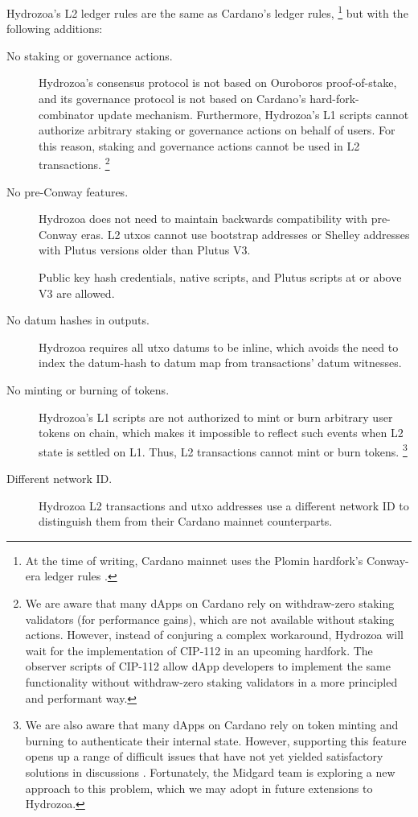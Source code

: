 \documentclass[../hydrozoa.tex]{subfiles}
\begin{document}
Hydrozoa's L2 ledger rules are the same as Cardano's ledger rules,%
\footnote{At the time of writing, Cardano mainnet uses the Plomin hardfork's Conway-era ledger rules \citep{IntersectMBOCardanoLedgerV117402025}.}
but with the following additions:
\begin{description}
    \item[No staking or governance actions.]
      Hydrozoa's consensus protocol is not based on Ouroboros proof-of-stake, and its governance protocol is not based on Cardano's hard-fork-combinator update mechanism.
      Furthermore, Hydrozoa's L1 scripts cannot authorize arbitrary staking or governance actions on behalf of users.
      For this reason, staking and governance actions cannot be used in L2 transactions.%
      \footnote{We are aware that many dApps on Cardano rely on withdraw-zero staking validators (for performance gains), which are not available without staking actions.
        However, instead of conjuring a complex workaround, Hydrozoa will wait for the implementation of CIP-112 \citep{DiSarroCIP112ObserveScript2024} in an upcoming hardfork.
        The observer scripts of CIP-112 allow dApp developers to implement the same functionality without withdraw-zero staking validators in a more principled and performant way.}
    \item[No pre-Conway features.] Hydrozoa does not need to maintain backwards compatibility with pre-Conway eras.
      L2 utxos cannot use bootstrap addresses or Shelley addresses with Plutus versions older than Plutus V3.

      Public key hash credentials, native scripts, and Plutus scripts at or above V3 are allowed.
    \item[No datum hashes in outputs.] Hydrozoa requires all utxo datums to be inline, which avoids the need to index the datum-hash to datum map from transactions' datum witnesses.
    \item[No minting or burning of tokens.]
      Hydrozoa's L1 scripts are not authorized to mint or burn arbitrary user tokens on chain, which makes it impossible to reflect such events when L2 state is settled on L1.
      Thus, L2 transactions cannot mint or burn tokens.%
      \footnote{We are also aware that many dApps on Cardano rely on token minting and burning to authenticate their internal state.
        However, supporting this feature opens up a range of difficult issues that have not yet yielded satisfactory solutions in discussions \citep{IOGExcludePhantomTokens2025}.
        Fortunately, the Midgard team is exploring a new approach to this problem, which we may adopt in future extensions to Hydrozoa.}
    \item[Different network ID.] Hydrozoa L2 transactions and utxo addresses use a different network ID to distinguish them from their Cardano mainnet counterparts.
\end{description}
\end{document}

